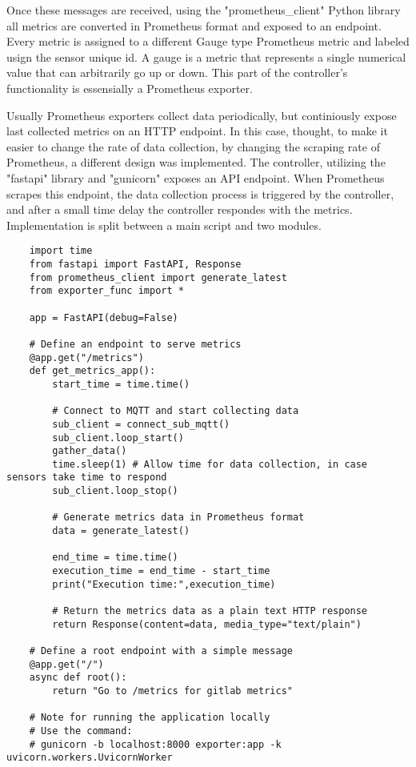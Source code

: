 Once these messages are received, using the "prometheus\_client" Python library all metrics are converted in Prometheus format and exposed to an endpoint. Every metric is assigned to a different Gauge type Prometheus metric and labeled usign the sensor unique id. A gauge is a metric that represents a single numerical value that can arbitrarily go up or down. This part of the controller's functionality is essensially a Prometheus exporter.

Usually Prometheus exporters collect data periodically, but continiously expose last collected metrics on an HTTP endpoint. In this case, thought, to make it easier to change the rate of data collection, by changing the scraping rate of Prometheus, a different design was implemented. The controller, utilizing the "fastapi" library and "gunicorn" exposes an API endpoint. When Prometheus scrapes this endpoint, the data collection process is triggered by the controller, and after a small time delay the controller respondes with the metrics. Implementation is split between a main script and two modules.

\begin{verbatim}
    import time
    from fastapi import FastAPI, Response
    from prometheus_client import generate_latest
    from exporter_func import *

    app = FastAPI(debug=False)

    # Define an endpoint to serve metrics
    @app.get("/metrics")
    def get_metrics_app():
        start_time = time.time()
        
        # Connect to MQTT and start collecting data
        sub_client = connect_sub_mqtt()
        sub_client.loop_start()
        gather_data()
        time.sleep(1) # Allow time for data collection, in case sensors take time to respond
        sub_client.loop_stop()

        # Generate metrics data in Prometheus format
        data = generate_latest()

        end_time = time.time()
        execution_time = end_time - start_time
        print("Execution time:",execution_time)

        # Return the metrics data as a plain text HTTP response
        return Response(content=data, media_type="text/plain")

    # Define a root endpoint with a simple message
    @app.get("/")
    async def root():
        return "Go to /metrics for gitlab metrics"

    # Note for running the application locally
    # Use the command:
    # gunicorn -b localhost:8000 exporter:app -k uvicorn.workers.UvicornWorker
\end{verbatim}

